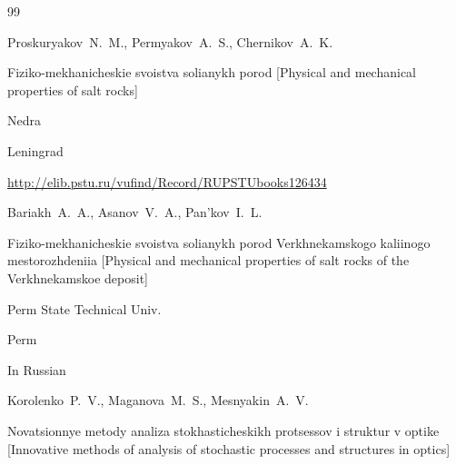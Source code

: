 









\begin{thebibliography}{99}






\by Proskuryakov~N.~M., Permyakov~A.~S., Chernikov~A.~K.

\book Fiziko-mekhanicheskie svoistva solianykh porod \rm [Physical and mechanical properties of salt rocks]


\publ  Nedra

\publaddr Leningrad









\elink \url{http://elib.pstu.ru/vufind/Record/RUPSTUbooks126434}

\by Bariakh~A.~A., Asanov~V.~A., Pan'kov~I.~L.

\book Fiziko-mekhanicheskie svoistva solianykh porod Verkhnekamskogo kaliinogo mestorozhdeniia \rm [Physical and mechanical properties of salt rocks of the Verkhnekamskoe deposit]


\publ Perm State Technical Univ.

\publaddr Perm

\lang In Russian









\by Korolenko~P.~V., Maganova~M.~S., Mesnyakin~A.~V.

\book Novatsionnye metody analiza stokhasticheskikh protsessov i struktur v optike \rm [Innovative methods of analysis of stochastic processes and structures in optics] 


\end{thebibliography}
